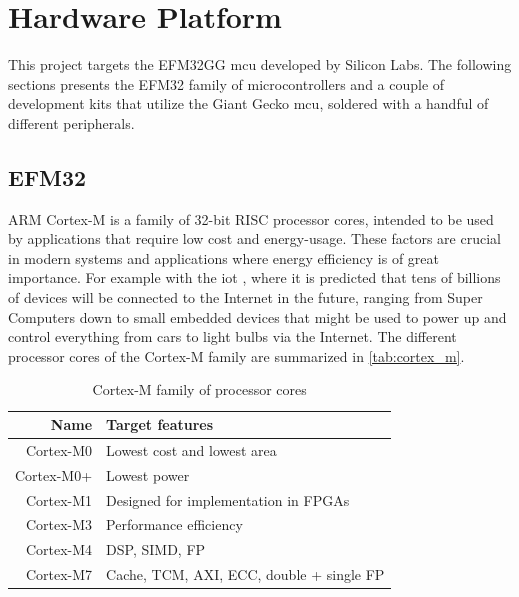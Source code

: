 \section{Hardware Platform}
\label{sec:back:hw}

This project targets the EFM32GG \gls{mcu} developed by Silicon Labs.
The following sections presents the EFM32 family of microcontrollers and a couple of development kits that utilize the Giant Gecko \gls{mcu}, soldered with a handful of different peripherals.

\subsection{EFM32}
\label{sub:emf32}

ARM Cortex-M is a family of 32-bit RISC processor cores, intended to be used by applications that require low cost and energy-usage.
These factors are crucial in modern systems and applications where energy efficiency is of great importance.
For example with the \gls{iot} \cite{Valhouli2010}, where it is predicted that tens of billions of devices will be connected to the Internet in the future, ranging from Super Computers down to small embedded devices that might be used to power up and control everything from cars to light bulbs via the Internet.
The different processor cores of the Cortex-M family are summarized in \autoref{tab:cortex_m}.

\begin{table}[h]
\begin{center}
\begin{tabular}{r|l}
    \textbf{Name} & \textbf{Target features}            \\
    \hline
    Cortex-M0 & Lowest cost and lowest area              \\
    Cortex-M0+ & Lowest power                            \\
    Cortex-M1 & Designed for implementation in FPGAs     \\
    Cortex-M3 & Performance efficiency                   \\
    Cortex-M4 & DSP, SIMD, FP                            \\
    Cortex-M7 & Cache, TCM, AXI, ECC, double + single FP \\
    \hline
    \end{tabular}
\end{center}
\caption{Cortex-M family of processor cores}
\label{tab:cortex_m}
\end{table}

